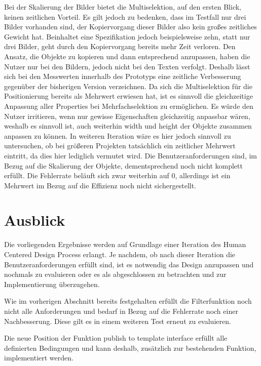 Bei der Skalierung der Bilder bietet die Multiselektion, auf den ersten Blick, keinen zeitlichen Vorteil.
Es gilt jedoch zu bedenken, dass im Testfall nur drei Bilder vorhanden sind, der Kopiervorgang dieser Bilder also kein großes zeitliches Gewicht hat.
Beinhaltet eine Spezifikation jedoch beispielsweise zehn, statt nur drei Bilder, geht durch den Kopiervorgang bereits mehr Zeit verloren.
Den Ansatz, die Objekte zu kopieren und dann entsprechend anzupassen, haben die Nutzer nur bei den Bildern, jedoch nicht bei den Texten verfolgt.
Deshalb lässt sich bei den Messwerten innerhalb des Prototyps eine zeitliche Verbesserung gegenüber der bisherigen Version verzeichnen.
Da sich die Multiselektion für die Positionierung bereits als Mehrwert erwiesen hat, ist es sinnvoll die gleichzeitige Anpassung aller Properties bei Mehrfachselektion zu ermöglichen.
Es würde den Nutzer irritieren, wenn nur gewisse Eigenschaften gleichzeitig anpassbar wären, weshalb es sinnvoll ist, auch weiterhin width und height der Objekte zusammen anpassen zu können.
In weiteren Iteration wäre es hier jedoch sinnvoll zu untersuchen, ob bei größeren Projekten tatsächlich ein zeitlicher Mehrwert eintritt, da dies hier lediglich vermutet wird.
Die Benutzeranforderungen sind, im Bezug auf die Skalierung der Objekte, dementsprechend noch nicht komplett erfüllt.
Die Fehlerrate beläuft sich zwar weiterhin auf 0, allerdings ist ein Mehrwert im Bezug auf die Effizienz noch nicht sichergestellt.

\section {Ausblick}
Die vorliegenden Ergebnisse werden auf Grundlage einer Iteration des Human Centered Design Process erlangt.
Je nachdem, ob nach dieser Iteration die Benutzeranforderungen erfüllt sind, ist es notwendig das Design anzupassen und nochmals zu evaluieren oder es als abgeschlossen zu betrachten und zur Implementierung überzugehen.

Wie im vorherigen Abschnitt bereits festgehalten erfüllt die Filterfunktion noch nicht alle Anforderungen und bedarf in Bezug auf die Fehlerrate noch einer Nachbesserung.
Diese gilt es in einem weiteren Test erneut zu evaluieren.

Die neue Position der Funktion \glqq publish to template interface\grqq{} erfüllt alle definierten Bedingungen und kann deshalb, zusätzlich zur bestehenden Funktion, implementiert werden.

